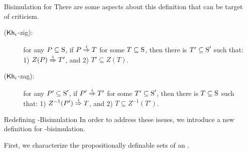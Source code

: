 \documentclass{beamer}
\begin{document}


\begin{frame}{Bisimulation for \KHilogic}
    There are some aspects about this definition that can be target of criticism. \pause
    
    \begin{description}
        \item[(${\operatorname{\sf Kh}_i}$-zig):] for any  $P \subseteq \operatorname{S}$, if $P \stackrel{i}{\Rightarrow} T$ for some $T \subseteq \operatorname{S}$, then there is $T' \subseteq \operatorname{S}'$ such that: 
            1) $Z(P) \stackrel{i}{\Rightarrow} T'$, and
            2) $T' \subseteq Z(T)$.

        \item[(${\operatorname{\sf Kh}_i}$-zag):] %
        for any  $P' \subseteq \operatorname{S}'$, if $P' \stackrel{i}{\Rightarrow} T'$ for some $T' \subseteq \operatorname{S}'$, then there is $T \subseteq \operatorname{S}$ such that: 
            1) $Z^{-1}(P') \stackrel{i}{\Rightarrow} T$, and
            2) $T \subseteq Z^{-1}(T')$.
    \end{description}


\end{frame}


\begin{frame}{Redefining \KHilogic-Bisimulation}
    In order to address these issues, we introduce a new definition for \KHilogic-bisimulation. \pause

    First, we characterize the propositionally definable sets of an \ults.
\end{frame}


\end{document}
